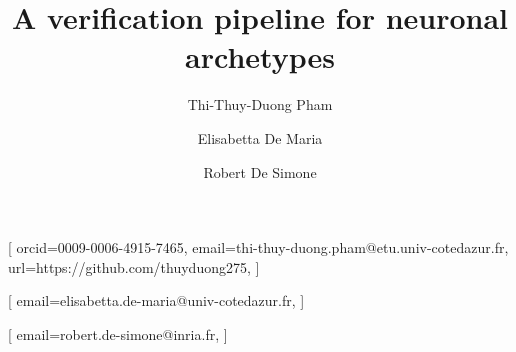 \documentclass[
]{ceurart}
\begin{document}


\title{A verification pipeline for neuronal archetypes}

\author[1]{Thi-Thuy-Duong Pham}[%
orcid=0009-0006-4915-7465,
email=thi-thuy-duong.pham@etu.univ-cotedazur.fr,
url=https://github.com/thuyduong275,
]

\cormark[1]
\address[1]{I3S, CNRS, Université Côte d'Azur, Sophia Antipolis, France}

\author[1]{Elisabetta De Maria}[%
email=elisabetta.de-maria@univ-cotedazur.fr,
]
\address[1]{I3S, CNRS, Université Côte d'Azur, Sophia Antipolis, France}

\author[2]{Robert De Simone}[%
email=robert.de-simone@inria.fr,
]
\address[2]{Centre Inria d'Université Côte d'Azur, Sophia Antipolis, France}

\end{document}
